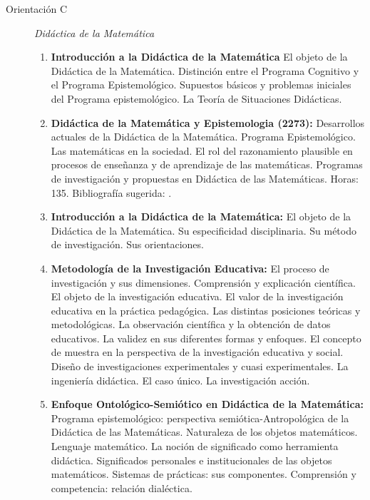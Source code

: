 \documentclass[a4paper, 12pt]{article}
\begin{document}
\begin{description}
\begin{enumerate}
\end{enumerate}

\item[Orientación C]\emph{Didáctica de la Matemática}








\begin{enumerate}

\item\textbf{Introducción a la Didáctica de la Matemática}
El objeto de la Didáctica de la Matemática. Distinción entre el Programa Cognitivo y el
Programa Epistemológico. Supuestos básicos y problemas iniciales del Programa
epistemológico. La Teoría de Situaciones Didácticas. \cite{Brousseau2007,Gascón2002,Gascón1998,Sadovsky2004}




\item\textbf{ Didáctica de la Matemática y Epistemologia (2273):} Desarrollos actuales de la Didáctica de la Matemática. Programa Epistemológico. Las matemáticas en la sociedad. El rol del razonamiento plausible en procesos de enseñanza y de aprendizaje de las matemáticas.  Programas de investigación y propuestas en Didáctica de las Matemáticas. Horas: 135. Bibliografía sugerida: \cite{chevallard, brousseau1986fundamentos,godino2012origen}.



\item  \textbf{Introducción a la Didáctica de la Matemática:} El objeto de la Didáctica de la
Matemática. Su especificidad disciplinaria. Su método de
investigación. Sus orientaciones.


\item\textbf{Metodología de la Investigación Educativa:} El proceso
de investigación y sus dimensiones. Comprensión y explicación
científica. El objeto de la investigación educativa. El valor de
la investigación educativa en la práctica pedagógica. Las
distintas posiciones teóricas y metodológicas. La observación
científica y la obtención de datos educativos. La validez en sus
diferentes formas y enfoques. El concepto de muestra en la
perspectiva de la investigación educativa y social. Diseño de
investigaciones experimentales y cuasi experimentales. La
ingeniería didáctica. El caso único. La investigación acción.



\item\textbf{Enfoque Ontológico-Semiótico en Didáctica de la
Matemática:} Programa epistemológico: perspectiva
semiótica-Antropológica de la Di\-dáctica de las Matemáticas.
Naturaleza de los objetos matemáticos. Lenguaje matemático. La
noción de significado como herramienta di\-dáctica. Significados
personales e institucionales de las objetos mate\-máticos.
Sistemas de prácticas: sus componentes. Comprensión y competencia:
relación dialéctica.


\end{enumerate}
\end{description}
\end{document}
